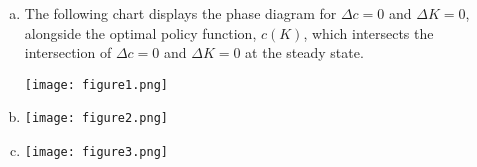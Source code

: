 \documentclass{article}
\begin{document}
\begin{enumerate}[(a)]
	\item The following chart displays the phase diagram for ${\Delta c=0}$ and ${\Delta K=0}$, alongside the optimal policy function, $c(K)$, which intersects the intersection of ${\Delta c=0}$ and ${\Delta K=0}$ at the steady state.
		\begin{center}
			\texttt{[image: figure1.png]}
		\end{center}
	
	\item 
		\begin{center}
			\texttt{[image: figure2.png]}
		\end{center}
	
	\item 
		\begin{center}
			\texttt{[image: figure3.png]}
		\end{center}
	
\end{enumerate}

\end{document}
